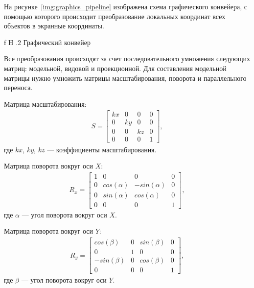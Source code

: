 На рисунке~\ref{img:graphics_pipeline} изображена схема графического конвейера, с помощью которого происходит преобразование локальных координат всех объектов в экранные координаты.

    {f}
    {H}
    {.2\textwidth}
    {Графический конвейер}
    
Все преобразования происходят за счет последовательного умножения следующих матриц: модельной, видовой и проекционной. 
Для составления модельной матрицы нужно умножить матрицы масштабирования,  поворота и параллельного переноса. 

Матрица масштабирования:
\begin{equation}
\begin{gathered}
S = 
	\begin{bmatrix}
		kx & 0 & 0 & 0 \\
		0 & ky & 0 & 0 \\
		0 & 0 & kz & 0 \\
		0 & 0 & 0 & 1
	\end{bmatrix},
\end{gathered}
\end{equation}
где $kx$, $ky$, $kz$ --- коэффициенты масштабирования.

Матрица поворота вокруг оси $X$:
\begin{equation}
\begin{gathered}
R_x = 
	\begin{bmatrix}
		1 & 0 & 0 & 0 \\
		0 & cos(\alpha) & -sin(\alpha) & 0 \\
		0 & sin(\alpha) & cos(\alpha) & 0 \\
		0 & 0 & 0 & 1
	\end{bmatrix},
\end{gathered}
\end{equation}
где $\alpha$  --- угол поворота вокруг оси $X$.

Матрица поворота вокруг оси $Y$:
\begin{equation}
\begin{gathered}
R_y = 
	\begin{bmatrix}
		cos(\beta) & 0 & sin(\beta) & 0 \\
		0 & 1 & 0 & 0 \\
		-sin(\beta) & 0 & cos(\beta) & 0 \\
		0 & 0 & 0 & 1
	\end{bmatrix},
\end{gathered}
\end{equation}
где $\beta$  --- угол поворота вокруг оси $Y$.

